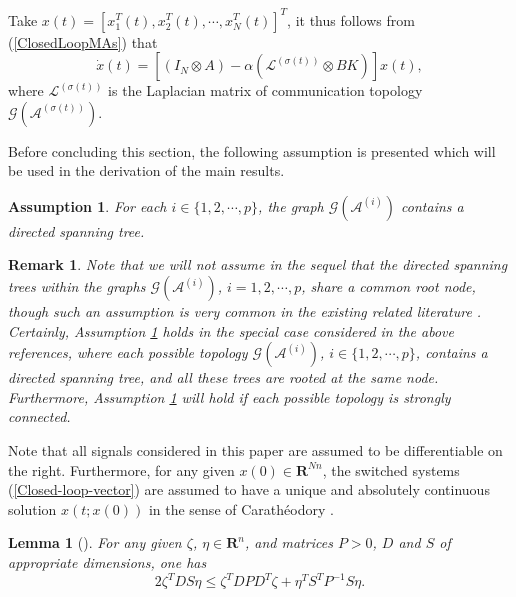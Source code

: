 \documentclass[letterpaper, 10 pt, conference]{ieeeconf}
\newtheorem{lemma}{Lemma}
\newtheorem{remark}{Remark}
\newtheorem{assumption}{Assumption}
\begin{document}
\par
Take $x(t)=\left[x_{1}^{T}(t),x_{2}^{T}(t),\cdots,x_{N}^{T}(t)\right]^{T}$, it thus follows from (\ref{ClosedLoopMAs}) that
\begin{equation}\label{Closed-loop-vector}
{\dot {x}}(t) = \left[(I_{N}\otimes A) - \alpha \left(\mathcal{L}^{(\sigma(t))}\otimes BK \right)\right] x(t),
\end{equation}
where $\mathcal{L}^{(\sigma(t))}$ is the Laplacian matrix of communication topology $\mathcal{G}(\mathcal{A}^{(\sigma(t))})$.


Before concluding this section, the following assumption is presented which
will be used in the derivation of  the main results.
\begin{assumption}\label{AssumptionTopology}
For each $i\in \{1,2,\cdots,p\}$, the graph $\mathcal{G}(\mathcal{A}^{(i)})$ contains a directed spanning tree.
\end{assumption}

\begin{remark}
Note that we will not assume in the sequel that the directed spanning trees
within the graphs $\mathcal{G}(\mathcal{A}^{(i)})$, $i= 1,2,\cdots,p$, share a
common root node, though such an assumption is very common in the existing
related literature
\cite{WenHuYuChenCaoSCL2013,WenYuCaoHuChenASCC2013,GaoZhuChenZhangMPE2013}.
Certainly, Assumption \ref{AssumptionTopology} holds in the special case
considered in the above references, where
each possible topology $\mathcal{G}(\mathcal{A}^{(i)})$, $i\in
\{1,2,\cdots,p\}$, contains a directed spanning tree, and all these trees
are rooted at the same node. Furthermore,
Assumption \ref{AssumptionTopology} will hold if each possible topology is
strongly connected.
\end{remark}
\par
Note that all signals considered in this paper are assumed to be
differentiable on the right. Furthermore, for any given  $x(0)\in
\mathbf{R}^{Nn}$, the switched systems (\ref{Closed-loop-vector}) are
assumed to have a unique and absolutely
continuous solution $x(t;x(0))$ in the sense of Carath\'{e}odory
\cite{DianelBook2003}.

\begin{lemma}[\cite{HornMatrix}]\label{lemmaInequality}
For any given $\zeta$, $\eta\in \mathbf{R}^{n}$, and matrices $P>0$, $D$ and $S$ of appropriate
dimensions, one has
\begin{equation}
2\zeta^{T}DS \eta\leq \zeta^{T}DPD^{T}\zeta+\eta^{T}S^{T}P^{-1}S\eta.
\end{equation}
\end{lemma}
\end{document}
